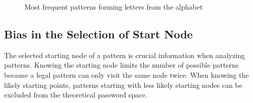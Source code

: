 \begin{figure}[H]

        \vspace{0.5cm}
        \caption{Most frequent patterns forming letters from the alphabet}
        \label{fig:associationpatterns}
      \end{figure}

    \clearpage

  \subsection{Bias in the Selection of Start Node}
    The selected starting node of a pattern is crucial information when analyzing patterns. Knowing the starting node limits the number of possible patterns because a legal pattern can only visit the same node twice. When knowing the likely starting points, patterns starting with less likely starting nodes can be excluded from the theoretical password space. 

